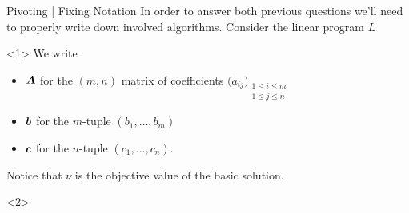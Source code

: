 \documentclass[aspectratio = 169]{beamer}
\begin{document}
\begin{frame}{Pivoting | Fixing Notation}
  In order to answer both previous questions we'll need to properly
  write down involved algorithms. Consider the linear program $L$
  \begin{figure}
    \end{figure}
    \begin{overlayarea}{\textwidth}{.3\textheight}
        \begin{onlyenv}<1>
          We write
            \begin{itemize}
            \item[\textbullet]
              $\boldsymbol{A}$ for the $(m, n)$ matrix of coefficients
              $\big(a_{ij}\big)_{\substack{1 \leq i \leq m \\ 1 \leq j \leq n}}$
            \item[\textbullet]
              $\boldsymbol{b}$ for the $m$-tuple $(b_1, \ldots, b_m)$
            \item[\textbullet]
              $\boldsymbol{c}$ for the $n$-tuple $(c_1, \ldots, c_n)$.
            \end{itemize}
            Notice that $\nu$ is the objective value of the basic
            solution.
        \end{onlyenv}
        \begin{onlyenv}<2>

\end{onlyenv}
\end{overlayarea}
\end{frame}
\end{document}
